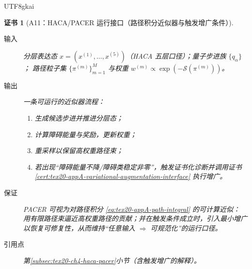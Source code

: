 \documentclass[12pt]{article}
\newtheorem{Certificate}{证书}[section]
\begin{document}
\begin{CJK*}{UTF8}{gkai}
\begin{Certificate}[A11：\textsf{HACA}/\textsf{PACER} 运行接口（路径积分近似器与触发增广条件）]
\label{cert:tex20-appA-haca-pacer-interface}
\begin{description}
  \item[输入] 分层表达态 $x=(x^{(1)},\dots,x^{(5)})$（\textsf{HACA} 五层口径）；量子步进族 $\{q_\alpha\}$；
  路径粒子集 $\{\pi^{(m)}\}_{m=1}^M$ 与权重 $w^{(m)}\propto \exp(-\mathcal{S}(\pi^{(m)}))$。
  \item[输出] 一条可运行的近似器流程：
  \begin{enumerate}
    \item 生成候选步进并推进分层态；
    \item 计算障碍能量与奖励，更新权重；
    \item 重采样以保留高权重路径束；
    \item 若出现“障碍能量不降/障碍类稳定非零”，触发证书化诊断并调用证书 \ref{cert:tex20-appA-variational-augmentation-interface} 执行增广。
  \end{enumerate}
  \item[保证] \textsf{PACER} 可视为对路径积分 \eqref{eq:tex20-appA-path-integral} 的可计算近似：
  用有限路径束逼近高权重路径的贡献；并在触发条件成立时，引入最小增广以恢复可修复性，从而维持“任意输入 \(\Rightarrow\) 可规范化”的运行口径。
  \item[引用点] 第\ref{subsec:tex20-ch4-haca-pacer}小节（含触发增广的解释）。
\end{description}
\end{Certificate}


\end{CJK*}
\end{document}
